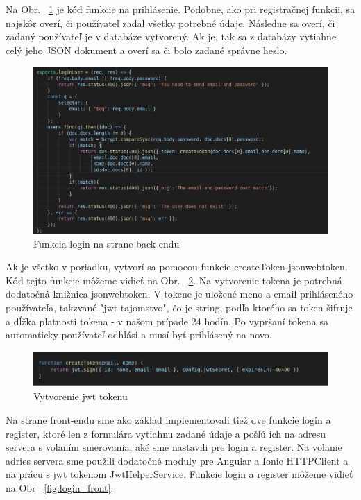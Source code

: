 \indent Na Obr. ~\ref{fig:login_back} je kód funkcie na prihlásenie. Podobne, ako pri registračnej funkcii, sa najskôr overí, či používateľ zadal všetky potrebné údaje. Následne sa overí, či zadaný používateľ je v databáze vytvorený. Ak je, tak sa z databázy vytiahne celý jeho JSON dokument a overí sa či bolo zadané správne heslo.

\begin{figure}[H]
    \centering
    \includegraphics[scale=0.40]{img/imp/login_back.png}
    \caption{Funkcia login na strane back-endu}
    \label{fig:login_back}
\end{figure}

\indent Ak je všetko v poriadku, vytvorí sa pomocou funkcie createToken jsonwebtoken. Kód tejto funkcie môžeme vidieť na Obr. ~\ref{fig:jwt}. Na vytvorenie tokena je potrebná dodatočná knižnica jsonwebtoken. V tokene je uložené meno a email prihláseného používateľa, takzvané "jwt tajomstvo", čo je string, podľa ktorého sa token šifruje a dĺžka platnosti tokena - v našom prípade 24 hodín. Po vypršaní tokena sa automaticky používateľ odhlási a musí byť prihlásený na novo. 

\begin{figure}[H]
    \centering
    \includegraphics[scale=0.42]{img/imp/jwt.png}
    \caption{Vytvorenie jwt tokenu}
    \label{fig:jwt}
\end{figure}

\indent Na strane front-endu sme ako základ implementovali tiež dve funkcie login a register, ktoré len z formulára vytiahnu zadané údaje a pošlú ich na adresu servera s volaním smerovania, aké sme nastavili pre login a register. Na volanie adries servera sme použili dodatočné moduly pre Angular a Ionic HTTPClient a na prácu s jwt tokenom JwtHelperService. Funkcie login a register môžeme vidieť na Obr ~\ref{fig:login_front}. 

